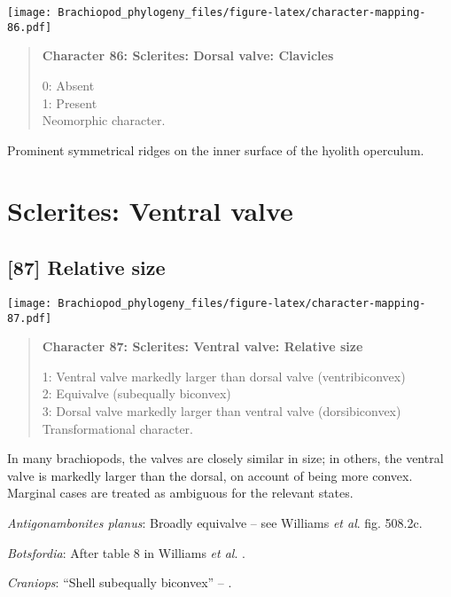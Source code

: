 \documentclass[openany]{book}
\theoremstyle{definition}
\theoremstyle{definition}
\theoremstyle{definition}
\theoremstyle{remark}
\begin{document}
\texttt{[image: Brachiopod\_phylogeny\_files/figure-latex/character-mapping-86.pdf]}

\begin{quote}
\textbf{Character 86: Sclerites: Dorsal valve: Clavicles}

0: Absent\\
1: Present\\
Neomorphic character.
\end{quote}

Prominent symmetrical ridges on the inner surface of the hyolith
operculum.

\section{Sclerites: Ventral valve}\label{sclerites-ventral-valve}

\subsection*{{[}87{]} Relative size}\label{relative-size}

\texttt{[image: Brachiopod\_phylogeny\_files/figure-latex/character-mapping-87.pdf]}

\begin{quote}
\textbf{Character 87: Sclerites: Ventral valve: Relative size}

1: Ventral valve markedly larger than dorsal valve (ventribiconvex)\\
2: Equivalve (subequally biconvex)\\
3: Dorsal valve markedly larger than ventral valve (dorsibiconvex)\\
Transformational character.
\end{quote}

In many brachiopods, the valves are closely similar in size; in others,
the ventral valve is markedly larger than the dorsal, on account of
being more convex. Marginal cases are treated as ambiguous for the
relevant states.

\hypertarget{Antigonambonites_planus-coding-87}{}
\emph{Antigonambonites planus}: Broadly equivalve -- see Williams
\emph{et al}. \citeyearpar{Williams2000LinguliformeaCraniiformea} fig.
508.2c.

\hypertarget{Botsfordia-coding-87}{}
\emph{Botsfordia}: After table 8 in Williams \emph{et al}.
\citeyearpar{Williams2000LinguliformeaCraniiformea}.

\hypertarget{Craniops-coding-87}{}
\emph{Craniops}: ``Shell subequally biconvex'' --
\citet{Williams2000LinguliformeaCraniiformea}.
\end{document}
